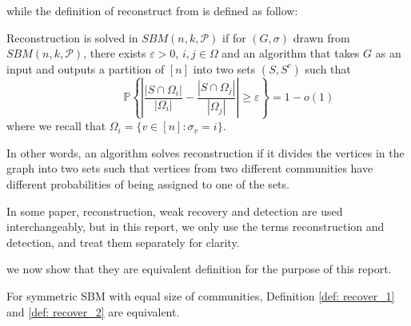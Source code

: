 while the definition of reconstruct from \cite{TheConjecture} is defined as follow:
\begin{definition}[Reconstruction]\label{def: recover_2}
Reconstruction is solved in $SBM(n,k,\mathcal{P})$ if for $(G,\sigma)$ drawn from $SBM(n,k,\mathcal{P})$, there exists $\varepsilon > 0$, $i,j \in\Omega$ and an algorithm that takes $G$ as an input and outputs a partition of $[n]$ into two sets $(S,S^c)$ such that\begin{equation}\label{equn:1.3}
    ~~~~~~~~~~~~~~~~~\mathbb{P}\left\{ \left| \frac{|S \cap \Omega_i|}{|\Omega_i|} - \frac{|S \cap \Omega_j|}{|\Omega_j|} \right| \geq \varepsilon \right\} = 1 - o(1)
\end{equation}
where we recall that $\Omega_i = \{ v\in [n] : \sigma_v = i \}.$
\end{definition}
\begin{remark}
    In other words, an algorithm solves reconstruction if it divides the vertices in the graph into two sets such that vertices from two different communities have different probabilities of being assigned to one of the sets.
\end{remark}
\begin{remark}
    In some paper, reconstruction, weak recovery and detection are used interchangeably, but in this report, we only use the terms reconstruction and detection, and treat them separately for clarity.
\end{remark}
we now show that they are equivalent definition for the purpose of this report.
\begin{claim}\label{claim1}
    For symmetric SBM with equal size of communities, Definition \ref{def: recover_1} and \ref{def: recover_2} are equivalent.
\end{claim}
